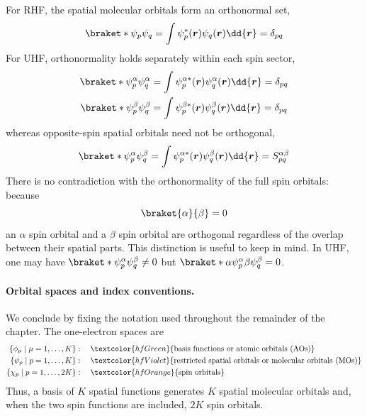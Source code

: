 \documentclass[11pt,a4paper,titlepage]{article}
\numberwithin{equation}{section}
\newcommand{\br}{\boldsymbol{r}}
\newcommand{\orange}[1]{\textcolor{hfOrange}{#1}}
\newcommand{\green}[1]{\textcolor{hfGreen}{#1}}
\newcommand{\violet}[1]{\textcolor{hfViolet}{#1}}
\begin{document}
For RHF, the spatial molecular orbitals form an orthonormal set,
\begin{equation}
  \braket*{\psi_p}{\psi_q}
  =
  \int
  \psi_p^*(\br)
  \psi_q(\br)
  \dd{\br}
  =
  \delta_{pq}
\end{equation}
For UHF, orthonormality holds separately within each spin sector,
\begin{equation}
\begin{split}
  \braket*{\psi_p^\alpha}{\psi_q^\alpha}
  &=
  \int
  \psi_p^{\alpha*}(\br)
  \psi_q^\alpha(\br)
  \dd{\br}
  =
  \delta_{pq}
  \\
  \braket*{\psi_p^\beta}{\psi_q^\beta}
  &=
  \int
  \psi_p^{\beta*}(\br)
  \psi_q^\beta(\br)
  \dd{\br}
  =
  \delta_{pq}
\end{split}
\end{equation}
whereas opposite-spin spatial orbitals need not be orthogonal,
\begin{equation}
  \braket*{\psi_p^\alpha}{\psi_q^\beta}
  =
  \int
  \psi_p^{\alpha*}(\br)
  \psi_q^\beta(\br)
  \dd{\br}
  =
  S_{pq}^{\alpha\beta}
\end{equation}
There is no contradiction with the orthonormality of the full spin orbitals:
because
\begin{equation}
  \braket{\alpha}{\beta}=0
\end{equation}
an $\alpha$ spin orbital and a $\beta$ spin orbital are orthogonal regardless
of the overlap between their spatial parts.
This distinction is useful to keep in mind. In UHF, one may have
$\braket*{\psi_p^\alpha}{\psi_q^\beta}\neq0$ but
$\braket*{\alpha\psi_p^\alpha}{\beta\psi_q^\beta}=0$.

\paragraph{Orbital spaces and index conventions.}

We conclude by fixing the notation used throughout the remainder of the
chapter. The one-electron spaces are
\begin{equation}
\begin{split}
  \{\phi_\mu\mid\mu=1,\ldots,K\}
  &:\quad
  \green{\text{basis functions or atomic orbitals (AOs)}}
  \\
  \{\psi_p\mid p=1,\ldots,K\}
  &:\quad
  \violet{\text{restricted spatial orbitals or molecular orbitals (MOs)}}
  \\
  \{\chi_p\mid p=1,\ldots,2K\}
  &:\quad
  \orange{\text{spin orbitals}}
\end{split}
\end{equation}
Thus, a basis of $K$ spatial functions generates $K$ spatial molecular
orbitals and, when the two spin functions are included, $2K$ spin orbitals.
\end{document}
